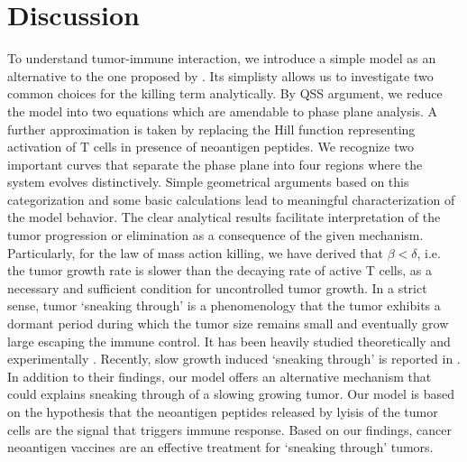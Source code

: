 \documentclass[review,authoryear]{elsarticle}
\begin{document}
\section{Discussion\label{sec:Discussion}}

To understand tumor-immune interaction, we introduce a simple model as
an alternative to the one proposed by \citet{Messan2021}. Its simplisty allows us to investigate two common choices for the killing term analytically. By QSS argument,
we reduce the model into two equations which are amendable to phase
plane analysis. A further approximation is taken by replacing the
Hill function representing activation of T cells in presence of neoantigen
peptides. We recognize two important curves that separate the phase
plane into four regions where the system evolves distinctively. Simple
geometrical arguments based on this categorization and some basic
calculations lead to meaningful characterization of the model behavior.
The clear analytical results facilitate interpretation of the tumor
progression or elimination as a consequence of the given mechanism.
Particularly, for the law of mass action killing, we have derived
that $\beta<\delta$, i.e. the tumor growth rate is slower than the
decaying rate of active T cells, as a necessary and sufficient condition
for uncontrolled tumor growth. In a strict sense, tumor `sneaking through'
is a phenomenology that the tumor exhibits a dormant period during which the
tumor size remains small and eventually grow large escaping the immune control. It has been heavily studied theoretically
and experimentally \citep[see e.g.][for a review]{Wilkie2013}. Recently,
slow growth induced `sneaking through' is reported in \cite{George2018}.
In addition to their findings, our model offers an alternative mechanism
that could explains sneaking through of a slowing growing tumor. Our model is based on the hypothesis that the neoantigen peptides released by lyisis of the tumor cells are the signal that triggers immune response. Based on our findings, cancer neoantigen vaccines are an effective treatment for `sneaking through' tumors.   
\end{document}
